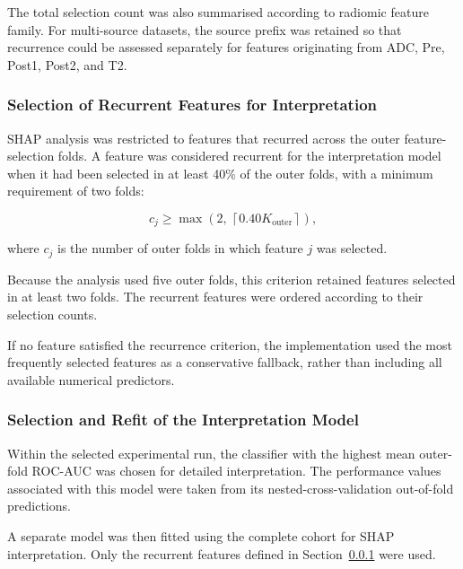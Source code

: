 \documentclass[12pt,twocolumn]{article}
\begin{document}
The total selection count was also summarised according to radiomic
feature family. For multi-source datasets, the source prefix was
retained so that recurrence could be assessed separately for features
originating from ADC, Pre, Post1, Post2, and T2.








\subsubsection{Selection of Recurrent Features for Interpretation}
\label{subsubsec:stable_features_for_interpretation}

SHAP analysis was restricted to features that recurred across the
outer feature-selection folds. A feature was considered recurrent for
the interpretation model when it had been selected in at least 40\%
of the outer folds, with a minimum requirement of two folds:

\begin{equation}
c_j
\geq
\max
\left(
2,\,
\left\lceil
0.40K_{\mathrm{outer}}
\right\rceil
\right),
\label{eq:stable_feature_threshold}
\end{equation}

where \(c_j\) is the number of outer folds in which feature \(j\) was
selected.

Because the analysis used five outer folds, this criterion retained
features selected in at least two folds. The recurrent features were
ordered according to their selection counts.

If no feature satisfied the recurrence criterion, the implementation
used the most frequently selected features as a conservative fallback,
rather than including all available numerical predictors.




\subsubsection{Selection and Refit of the Interpretation Model}
\label{subsubsec:interpretation_model}

Within the selected experimental run, the classifier with the highest
mean outer-fold ROC-AUC was chosen for detailed interpretation. The
performance values associated with this model were taken from its
nested-cross-validation out-of-fold predictions.

A separate model was then fitted using the complete cohort for SHAP
interpretation. Only the recurrent features defined in
Section~\ref{subsubsec:stable_features_for_interpretation} were used.
\end{document}
